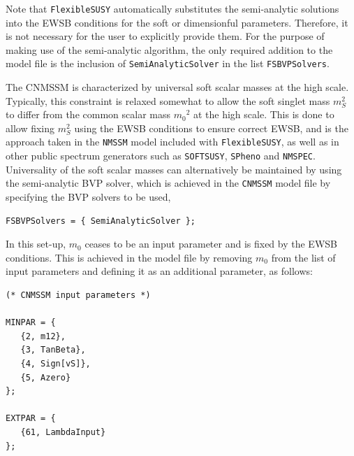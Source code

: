 \documentclass[final,3p,11pt,pdflatex]{elsarticle}
\makeatletter
\newcommand{\modelname}[1]{\texttt{#1}\@\xspace}
\newcommand{\spheno}{\texttt{SPheno}\@\xspace}
\newcommand{\nmspec}{\texttt{NMSPEC}\@\xspace}
\newcommand{\fs}{\texttt{FlexibleSUSY}\@\xspace}
\newcommand{\softsusy}{\texttt{SOFTSUSY}\@\xspace}
\newcommand{\code}[1]{\lstinline|#1|}  %
\newcommand{\mzero}{\ensuremath{m_0}\xspace}
\makeatother
\begin{document}
Note that \fs automatically substitutes the semi-analytic solutions into
the EWSB conditions for the soft or dimensionful parameters.  Therefore, it
is not necessary for the user to explicitly provide them.  For the purpose of
making use of the semi-analytic algorithm, the only required addition to the
model file is the inclusion of \code{SemiAnalyticSolver} in the list
\code{FSBVPSolvers}.

\begin{example}
The CNMSSM is characterized by universal soft scalar masses at the
high scale.  Typically, this constraint is relaxed somewhat to allow the
soft singlet mass $m_S^2$ to differ from the common scalar mass $\mzero^2$ at
the high scale.  This is done to allow fixing $m_S^2$ using the EWSB conditions
to ensure correct EWSB, and is the approach taken in the \modelname{NMSSM} model
included with \fs, as well as in other public spectrum generators such as
\softsusy, \spheno and \nmspec.  Universality of the soft scalar masses can
alternatively be maintained by using the semi-analytic BVP solver, which is
achieved in the \modelname{CNMSSM} model file by specifying the BVP solvers to
be used,
%
\begin{lstlisting}
FSBVPSolvers = { SemiAnalyticSolver };
\end{lstlisting}
In this set-up, $\mzero$ ceases to be an input parameter and is fixed by the
EWSB conditions.  This is achieved in the model file by removing $\mzero$ from
the list of input parameters and defining it as an additional parameter, as
follows:
%
\begin{lstlisting}
(* CNMSSM input parameters *)

MINPAR = {
   {2, m12},
   {3, TanBeta},
   {4, Sign[vS]},
   {5, Azero}
};

EXTPAR = {
   {61, LambdaInput}
};


\end{lstlisting}
\end{example}
\end{document}
